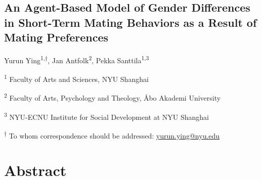 \documentclass[
  11pt,
]{article}
\author{}
\date{\vspace{-2.5em}}
\begin{document}
\begin{titlepage}

\begin{center}

\vspace*{30mm}

\hypertarget{an-agent-based-model-of-gender-differences-in-short-term-mating-behaviors-as-a-result-of-mating-preferences}{%
\section*{An Agent-Based Model of Gender Differences in Short-Term
Mating Behaviors as a Result of Mating
Preferences}\label{an-agent-based-model-of-gender-differences-in-short-term-mating-behaviors-as-a-result-of-mating-preferences}}

\vspace{30mm}

Yurun Ying\textsuperscript{1,\(\dagger\)}, Jan
Antfolk\textsuperscript{2}, Pekka Santtila\textsuperscript{1,3}

\textsuperscript{1} Faculty of Arts and Sciences, NYU Shanghai

\textsuperscript{2} Faculty of Arts, Psychology and Theology, Åbo
Akademi University

\textsuperscript{3} NYU-ECNU Institute for Social Development at NYU
Shanghai

\end{center}

\vspace{40mm}

\textsuperscript{\(\dagger\)} To whom correspondence should be
addressed: \url{yurun.ying@nyu.edu}

\end{titlepage}

\newpage

\hypertarget{abstract}{%
\section*{Abstract}\label{abstract}}
\end{document}
